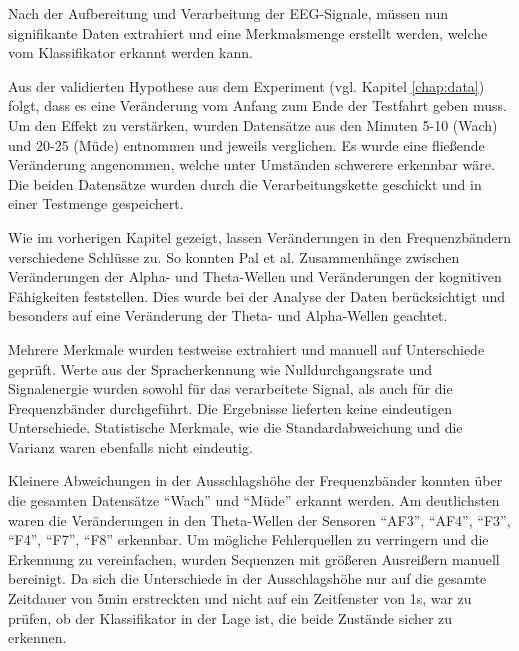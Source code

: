 \label{sec:extraction}
Nach der Aufbereitung und Verarbeitung der EEG-Signale, müssen nun signifikante Daten extrahiert und eine Merkmalsmenge erstellt werden, welche vom Klassifikator erkannt werden kann. 

Aus der validierten Hypothese aus dem Experiment (vgl. Kapitel \ref{chap:data}) folgt, dass es eine Veränderung vom Anfang zum Ende der Testfahrt geben muss. Um den Effekt zu verstärken, wurden Datensätze aus den Minuten 5-10 (Wach) und 20-25 (Müde) entnommen und jeweils verglichen. Es wurde eine fließende Veränderung angenommen, welche unter Umständen schwerere erkennbar wäre. Die beiden Datensätze wurden durch die Verarbeitungskette geschickt und in einer Testmenge gespeichert. 

Wie im vorherigen Kapitel gezeigt, lassen Veränderungen in den Frequenzbändern verschiedene Schlüsse zu. So konnten Pal et al. \cite{Pal2008} Zusammenhänge zwischen Veränderungen der Alpha- und Theta-Wellen und Veränderungen der kognitiven Fähigkeiten feststellen. Dies wurde bei der Analyse der Daten berücksichtigt und besonders auf eine Veränderung der Theta- und Alpha-Wellen geachtet. 

Mehrere Merkmale wurden testweise extrahiert und manuell auf Unterschiede geprüft. Werte aus der Spracherkennung wie Nulldurchgangsrate und Signalenergie wurden sowohl für das verarbeitete Signal, als auch für die Frequenzbänder durchgeführt. Die Ergebnisse lieferten keine eindeutigen Unterschiede. Statistische Merkmale, wie die Standardabweichung und die Varianz waren ebenfalls nicht eindeutig. 

Kleinere Abweichungen in der Ausschlagshöhe der Frequenzbänder konnten über die gesamten Datensätze "`Wach"' und "`Müde"' erkannt werden. Am deutlichsten waren die Veränderungen in den Theta-Wellen der Sensoren "`AF3"', "`AF4"', "`F3"', "`F4"', "`F7"', "`F8"' erkennbar. Um mögliche Fehlerquellen zu verringern und die Erkennung zu vereinfachen, wurden Sequenzen mit größeren Ausreißern manuell bereinigt. Da sich die Unterschiede in der Ausschlagshöhe nur auf die gesamte Zeitdauer von 5min erstreckten und nicht auf ein Zeitfenster von 1s, war zu prüfen, ob der Klassifikator in der Lage ist, die beide Zustände sicher zu erkennen.